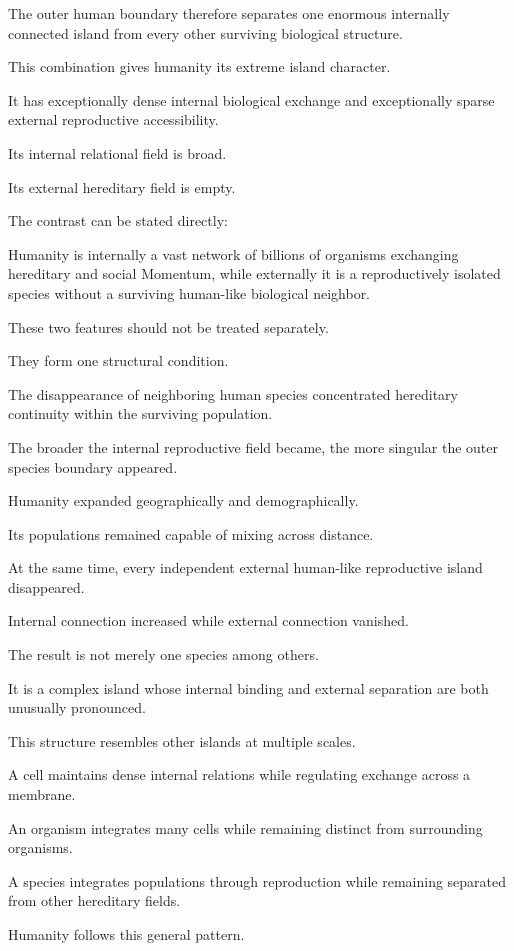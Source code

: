 The outer human boundary therefore separates one enormous internally connected island from every other surviving biological structure.

This combination gives humanity its extreme island character.

It has exceptionally dense internal biological exchange and exceptionally sparse external reproductive accessibility.

Its internal relational field is broad.

Its external hereditary field is empty.

The contrast can be stated directly:

Humanity is internally a vast network of billions of organisms exchanging hereditary and social Momentum, while externally it is a reproductively isolated species without a surviving human-like biological neighbor.

These two features should not be treated separately.

They form one structural condition.

The disappearance of neighboring human species concentrated hereditary continuity within the surviving population.

The broader the internal reproductive field became, the more singular the outer species boundary appeared.

Humanity expanded geographically and demographically.

Its populations remained capable of mixing across distance.

At the same time, every independent external human-like reproductive island disappeared.

Internal connection increased while external connection vanished.

The result is not merely one species among others.

It is a complex island whose internal binding and external separation are both unusually pronounced.

This structure resembles other islands at multiple scales.

A cell maintains dense internal relations while regulating exchange across a membrane.

An organism integrates many cells while remaining distinct from surrounding organisms.

A species integrates populations through reproduction while remaining separated from other hereditary fields.

Humanity follows this general pattern.

